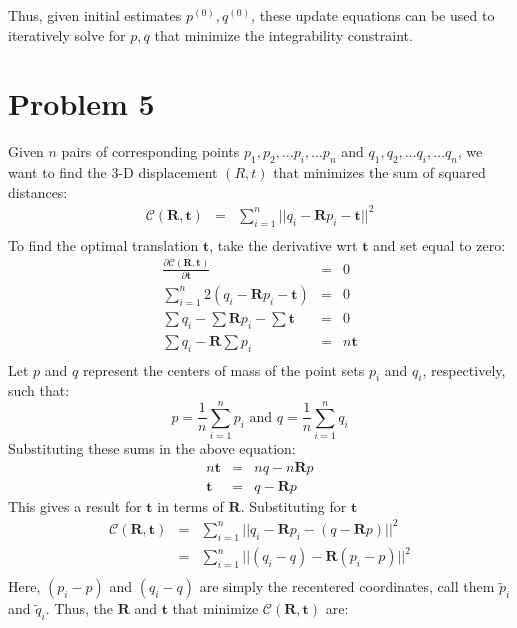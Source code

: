 \documentclass[letter,11pt]{article}
\begin{document}
{{Thus, given initial estimates $p^{(0)}, q^{(0)}$, these update equations can be used to iteratively 
solve for $p,q$ that minimize the integrability constraint.

\section*{Problem 5}
Given $n$ pairs of corresponding points $p_1, p_2, \dots p_i, \dots p_n$ and $q_1, q_2, \dots q_i, \dots q_n$, we want to find the 3-D displacement $(R,t)$ that minimizes the sum of squared distances:
\begin{eqnarray*}
	\mathcal{C}(\mathbf{R},\mathbf{t}) &=& \sum_{i=1}^n || q_i - \mathbf{R}p_i - \mathbf{t} ||^2 \\
\end{eqnarray*}
To find the optimal translation $\mathbf{t}$, take the derivative wrt $\mathbf{t}$ and set equal to zero:
\begin{eqnarray*}
	\frac{\partial\mathcal{C}(\mathbf{R},\mathbf{t})}{\partial\mathbf{t}} &=& 0 \\
	\sum_{i=1}^n 2(q_i-\mathbf{R}p_i-\mathbf{t}) &=& 0\\
	\sum q_i - \sum \mathbf{R} p_i - \sum \mathbf{t} &=& 0 \\
	\sum q_i - \mathbf{R}\sum p_i &=& n\mathbf{t} \\
\end{eqnarray*}
Let $p$ and $q$ represent the centers of mass of the point sets  $p_i$ and $q_i$, respectively, such that:
$$p=\frac{1}{n}\sum_{i=1}^n p_i \textrm{ and } q=\frac{1}{n}\sum_{i=1}^n q_i$$
Substituting these sums in the above equation:
\begin{eqnarray*}
	n\mathbf{t} &=& nq - n\mathbf{R}p \\
	\mathbf{t} &=& q-\mathbf{R}p
\end{eqnarray*}
This gives a result for $\mathbf{t}$ in terms of $\mathbf{R}$.  Substituting for $\mathbf{t}$ 
\begin{eqnarray*}
	\mathcal{C}(\mathbf{R},\mathbf{t}) &=& 
		\sum_{i=1}^n || q_i - \mathbf{R}p_i - (q - \mathbf{R}p) ||^2 \\
	&=& \sum_{i=1}^n || ( q_i - q ) -\mathbf{R}(p_i - p) ||^2 \\
\end{eqnarray*}
Here, $(p_i-p)$ and $(q_i-q)$ are simply the recentered coordinates, call them $\tilde{p}_i$ and $\tilde{q}_i$.  Thus, the $\mathbf{R}$ and $\mathbf{t}$ that minimize $\mathcal{C}(\mathbf{R},\mathbf{t})$ are:
\begin{eqnarray*}

\end{eqnarray*}}}
\end{document}

